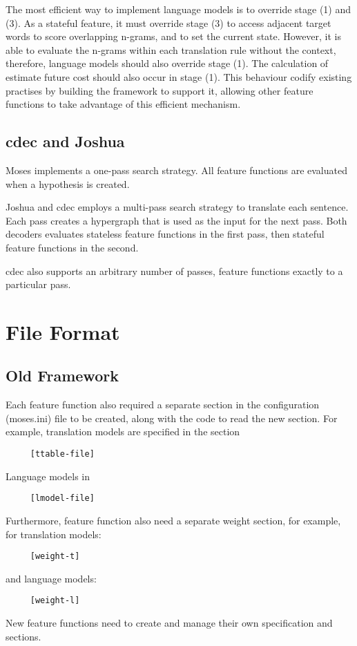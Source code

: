 \documentclass{pbml}
\begin{document}
The most efficient way to implement language models is to override stage (1) and (3). As a stateful feature, it must override stage (3) to access adjacent target words to score overlapping n-grams, and to set the current state. However, it is able to evaluate the n-grams within each translation rule without the context, therefore, language models should also override stage (1). The calculation of estimate future cost should also occur in stage (1). This behaviour codify existing practises by building the framework to support it, allowing other feature functions to take advantage of this efficient mechanism.

\subsection{cdec and Joshua}
Moses implements a one-pass search strategy. All feature functions are evaluated when a hypothesis is created.

Joshua and cdec employs a multi-pass search strategy to translate each sentence. Each pass creates a hypergraph that is used as the input for the next pass. Both decoders evaluates stateless feature functions in the first pass, then stateful feature functions in the second.

cdec also supports an arbitrary number of passes, feature functions exactly to a particular pass.

\section{File Format}
\subsection{Old Framework}
Each feature function also required a separate section in the configuration (moses.ini) file to be created, along with the code to read the new section. For example, translation models are specified in the section
\begin{verbatim}
     [ttable-file]
\end{verbatim}
Language models in
\begin{verbatim}
     [lmodel-file]
\end{verbatim}
Furthermore, feature function also need a separate weight section, for example, for translation models:
\begin{verbatim}
     [weight-t]
\end{verbatim}
and language models:
\begin{verbatim}
     [weight-l]
\end{verbatim}
New feature functions need to create and manage their own specification and sections.
\end{document}
